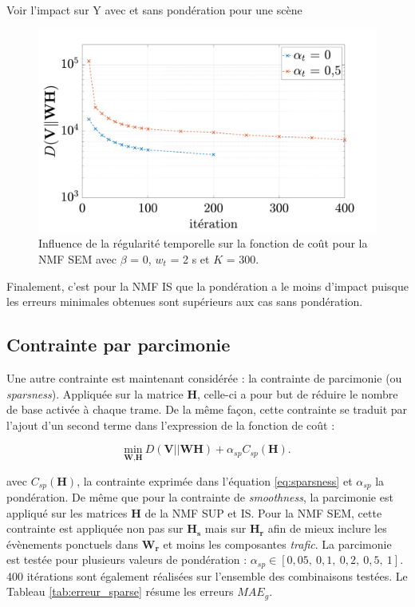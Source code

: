 Voir l'impact sur Y avec et sans pondération pour une scène
 
\begin{figure}[h]
\centering
\includegraphics[width=.7\linewidth]{./figures/resultats/grafic_smooth_cost_beta0.pdf}
\caption{Influence de la régularité temporelle sur la fonction de coût pour la NMF SEM avec $\beta$ = 0, $w_t$ = 2 s et $K$ = 300.}
\end{figure}

Finalement, c'est pour la NMF IS que la pondération a le moins d'impact puisque les erreurs minimales obtenues sont supérieurs aux cas sans pondération. 

\subsection{Contrainte par parcimonie}

Une autre contrainte est maintenant considérée : la contrainte de parcimonie (ou \textit{sparsness}). Appliquée sur la matrice $\mathbf{H}$, celle-ci a pour but de réduire le nombre de base activée à chaque trame. De la même façon, cette contrainte se traduit par l'ajout d'un second terme dans l'expression de la fonction de coût : 

\begin{equation}
\underset{\textbf{W},\textbf{H}}{\text{min}}~D\left(\textbf{V} \vert\vert \textbf{WH}\right) + \alpha_{sp} C_{sp}(\mathbf{H}).
\end{equation}

avec $C_{sp}(\mathbf{H})$, la contrainte exprimée dans l'équation \ref{eq:sparsness} et $\alpha_{sp}$ la pondération. De même que pour la contrainte de \textit{smoothness}, la parcimonie est appliqué sur les matrices $\mathbf{H}$ de la NMF SUP et IS. Pour la NMF SEM, cette contrainte est appliquée non pas sur $\mathbf{H_s}$ mais sur $\mathbf{H_r}$ afin de mieux inclure les évènements ponctuels dans $\mathbf{W_r}$ et moins les composantes \textit{trafic}. La parcimonie est testée pour plusieurs valeurs de pondération : $\alpha_{sp} \in \left[0,05,~ 0,1,~ 0,2,~ 0,5,~ 1\right]$. 400 itérations sont également réalisées sur l'ensemble des combinaisons testées. Le Tableau \ref{tab:erreur_sparse} résume les erreurs $MAE_g$.

